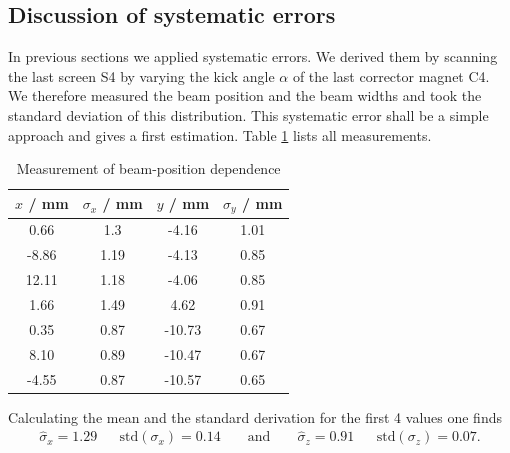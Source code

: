 \documentclass[11pt,a4paper,notitlepage]{scrartcl}
\begin{document}
\subsection{Discussion of systematic errors}
\label{subsec:err}
In previous sections we applied systematic errors. We derived them by scanning the last screen S4 by varying the kick angle $\alpha$ of the last corrector magnet C4. We therefore measured the beam position and the beam widths and took the standard deviation of this distribution. This systematic error shall be a simple approach and gives a first estimation. Table \ref{tab:sys_error} lists all measurements.

\begin{table}[H]
	\centering
	\begin{tabular}{|c|c|c|c|}
		\hline
		$x$ / mm &	$\sigma_x$ / mm	&$y$ / mm&	$\sigma_y$ / mm\\
		\hline
		0.66&	1.3	&-4.16&	1.01 \\
		-8.86&	1.19&	-4.13	&0.85 \\
		12.11&	1.18&	-4.06	&0.85 \\
		1.66&	1.49&	4.62	&0.91 \\
		0.35&	0.87&	-10.73&	0.67 \\
		8.10&	0.89&	-10.47&	0.67 \\
		-4.55&	0.87&	-10.57&	0.65 \\
		\hline
	\end{tabular}
	\caption{Measurement of beam-position dependence}\label{tab:sys_error}
\end{table}
Calculating the mean and the standard derivation for the first 4 values one finds
\begin{align*}
	\hat\sigma_x=1.29&& \text{std}(\sigma_x)=0.14&& \text{ and } &&\hat\sigma_z=0.91&&\text{std}(\sigma_z)=0.07.
\end{align*}
\end{document}
